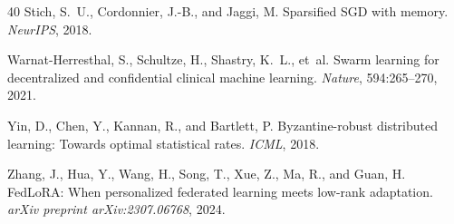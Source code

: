 \documentclass[11pt]{article}
\begin{document}
\begin{thebibliography}{40}
Stich, S.~U., Cordonnier, J.-B., and Jaggi, M.
\newblock Sparsified SGD with memory.
\newblock \emph{NeurIPS}, 2018.

Warnat-Herresthal, S., Schultze, H., Shastry, K.~L., et~al.
\newblock Swarm learning for decentralized and confidential clinical machine
  learning.
\newblock \emph{Nature}, 594:265--270, 2021.

Yin, D., Chen, Y., Kannan, R., and Bartlett, P.
\newblock Byzantine-robust distributed learning: Towards optimal statistical
  rates.
\newblock \emph{ICML}, 2018.

Zhang, J., Hua, Y., Wang, H., Song, T., Xue, Z., Ma, R., and Guan, H.
\newblock FedLoRA: When personalized federated learning meets low-rank
  adaptation.
\newblock \emph{arXiv preprint arXiv:2307.06768}, 2024.

\end{thebibliography}
\end{document}
